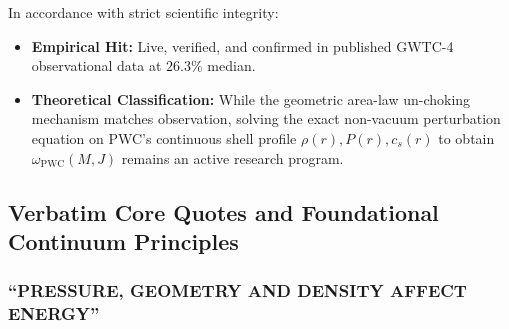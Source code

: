 \documentclass[11pt,a4paper]{article}
\begin{document}
In accordance with strict scientific integrity:
\begin{itemize}
    \item \textbf{Empirical Hit:} Live, verified, and confirmed in published GWTC-4 observational data at $26.3\%$ median.
    \item \textbf{Theoretical Classification:} While the geometric area-law un-choking mechanism matches observation, solving the exact non-vacuum perturbation equation on PWC's continuous shell profile $\rho(r), P(r), c_s(r)$ to obtain $\omega_{\text{PWC}}(M, J)$ remains an active research program.
\end{itemize}

\subsection{Verbatim Core Quotes and Foundational Continuum Principles}
\label{subsec:verbatim_quotes}

\subsubsection{``PRESSURE, GEOMETRY AND DENSITY AFFECT ENERGY''}
\label{subsubsec:quote_pressure_geom_density}
\end{document}
